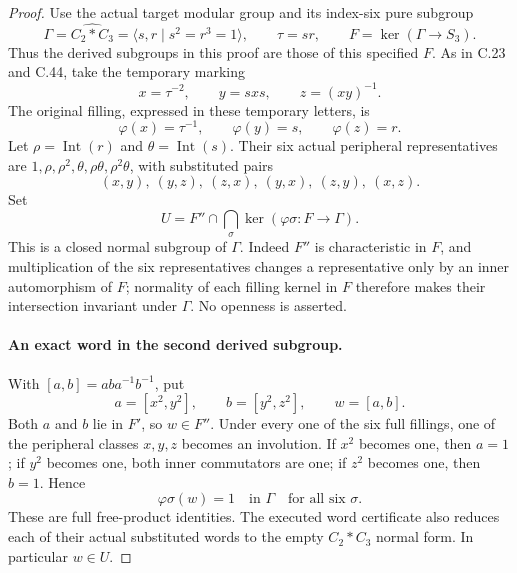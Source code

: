 \begin{proof}
Use the actual target modular group and its index-six pure subgroup
\[
 \Gamma=\widehat{C_2*C_3}=\langle s,r\mid s^2=r^3=1\rangle,
 \qquad \tau=sr,\qquad F=\ker(\Gamma\longrightarrow S_3).
\]
Thus the derived subgroups in this proof are those of this specified
$F$. As in C.23 and C.44, take the temporary marking
\[
 x=\tau^{-2},\qquad y=sxs,\qquad z=(xy)^{-1}.
\]
The original filling, expressed in these temporary letters, is
\[
 \varphi(x)=\tau^{-1},\qquad \varphi(y)=s,\qquad
 \varphi(z)=r.                                       \tag{C.46.2}
\]
Let $\rho=\operatorname{Int}(r)$ and
$\theta=\operatorname{Int}(s)$. Their six actual peripheral
representatives are $1,\rho,\rho^2,\theta,\rho\theta,
\rho^2\theta$, with substituted pairs
\[
 (x,y),\ (y,z),\ (z,x),\ (y,x),\ (z,y),\ (x,z).
                                                               \tag{C.46.3}
\]
Set
\[
 U=F''\cap\bigcap_\sigma\ker(\varphi\sigma:F\to\Gamma).
                                                               \tag{C.46.4}
\]
This is a closed normal subgroup of $\Gamma$. Indeed $F''$ is
characteristic in $F$, and multiplication of the six representatives
changes a representative only by an inner automorphism of $F$;
normality of each filling kernel in $F$ therefore makes their
intersection invariant under $\Gamma$. No openness is asserted.

\paragraph{An exact word in the second derived subgroup.}
With $[a,b]=aba^{-1}b^{-1}$, put
\[
 a=[x^2,y^2],\qquad b=[y^2,z^2],\qquad w=[a,b].       \tag{C.46.5}
\]
Both $a$ and $b$ lie in $F'$, so $w\in F''$. Under every one
of the six full fillings, one of the peripheral classes $x,y,z$
becomes an involution. If $x^2$ becomes one, then $a=1$;
if $y^2$ becomes one, both inner commutators are one; if $z^2$
becomes one, then $b=1$. Hence
\[
                 \varphi\sigma(w)=1\quad\text{in }\Gamma
                 \quad\text{for all six }\sigma.    \tag{C.46.6}
\]
These are full free-product identities. The executed word certificate
also reduces each of their actual substituted words to the empty
$C_2*C_3$ normal form. In particular $w\in U$.


\end{proof}
